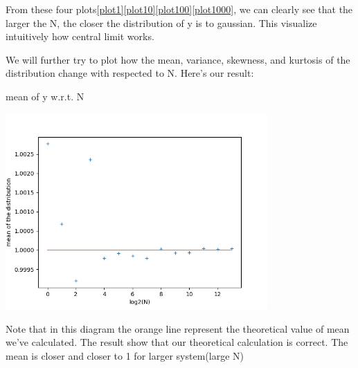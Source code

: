 \documentclass[letterpaper,12pt]{article}
\begin{document}
\newpage

\newpage

From these four plots\ref{plot1}\ref{plot10}\ref{plot100}\ref{plot1000}, we can clearly see that the larger the N, the closer the distribution of y is to gaussian. This visualize intuitively how central limit works.

\newpage
We will further try to plot how the mean, variance, skewness, and kurtosis of the distribution change with respected to N. Here's our result:

\begin{table}[!h]
    \centering
    \caption{mean of y w.r.t. N}
    \includegraphics[width=10cm]{ps3-4-21.png}
    \label{plot123}%
\end{table}%
\newpage
Note that in this diagram the orange line represent the theoretical value of mean we've calculated. The result show that our theoretical calculation is correct. The mean is closer and closer to 1 for larger system(large N)
\end{document}
